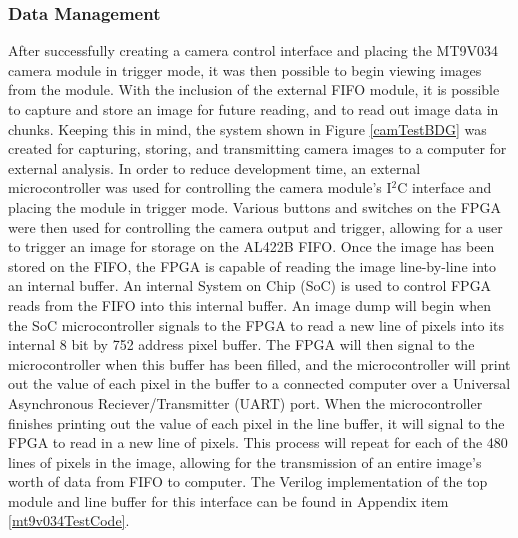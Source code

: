 \subsubsection{Data Management}
After successfully creating a camera control interface and placing the MT9V034 camera module in trigger mode, it was then possible to begin viewing images from the module. With the inclusion of the external FIFO module, it is  possible to capture and store an image for future reading, and to read out image data in chunks. Keeping this in mind, the system shown in Figure \ref{camTestBDG} was created for capturing, storing, and transmitting camera images to a computer for external analysis. In order to reduce development time, an external microcontroller was used for controlling the camera module's I$^2$C interface and placing the module in trigger mode. Various buttons and switches on the FPGA were then used for controlling the camera output and trigger, allowing for a user to trigger an image for storage on the AL422B FIFO. Once the image has been stored on the FIFO, the FPGA is capable of reading the image line-by-line into an internal buffer. An internal System on Chip (SoC) is used to control FPGA reads from the FIFO into this internal buffer. An image dump will begin when the SoC microcontroller signals to the FPGA to read a new line of pixels into its internal 8 bit by 752 address pixel buffer. The FPGA will then signal to the microcontroller when this buffer has been filled, and the microcontroller will print out the value of each pixel in the buffer to a connected computer over a Universal Asynchronous Reciever/Transmitter (UART) port. When the microcontroller finishes printing out the value of each pixel in the line buffer, it will signal to the FPGA to read in a new line of pixels. This process will repeat for each of the 480 lines of pixels in the image, allowing for the transmission of an entire image's worth of data from FIFO to computer. The Verilog implementation of the top module and line buffer for this interface can be found in Appendix item \ref{mt9v034TestCode}.


